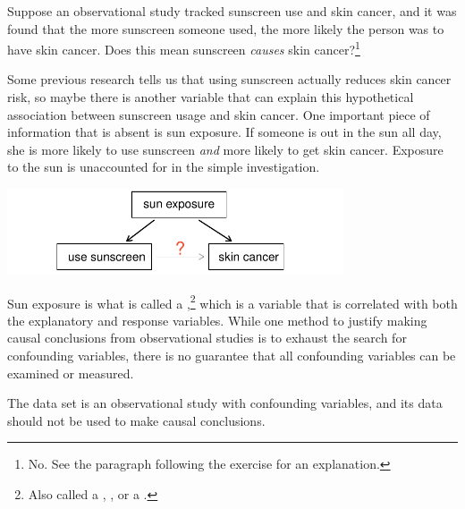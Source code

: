 \begin{doublespace}
\begin{exercise} \label{sunscreenLurkingExample}
Suppose an observational study tracked sunscreen use and skin cancer, and it was found that the more sunscreen someone used, the more likely the person was to have skin cancer. Does this mean sunscreen \emph{causes} skin cancer?\footnote{No. See the paragraph following the exercise for an explanation.}
\end{exercise}

Some previous research tells us that using sunscreen actually reduces skin cancer risk, so maybe there is another variable that can explain this hypothetical association between sunscreen usage and skin cancer. One important piece of information that is absent is sun exposure. If someone is out in the sun all day, she is more likely to use sunscreen \emph{and} more likely to get skin cancer. Exposure to the sun is unaccounted for in the simple investigation.
\begin{center}
\includegraphics[height=1.0in]{ch_intro_to_data_oi_biostat/figures/variables/sunCausesCancer}
\end{center}

Sun exposure is what is called a ,\footnote{Also called a , , or a .} which is a variable that is correlated with both the explanatory and response variables. While one method to justify making causal conclusions from observational studies is to exhaust the search for confounding variables, there is no guarantee that all confounding variables can be examined or measured.

The  data set is an observational study with confounding variables, and its data should not be used to make causal conclusions.


\end{doublespace}
